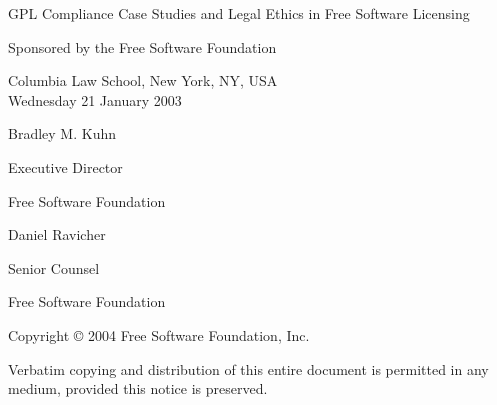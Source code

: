 \documentclass[12pt]{report}
\begin{document}
\begin{titlepage}


\begin{center}

\vspace{.5in}

{\Large {\sc GPL Compliance Case Studies and Legal Ethics in Free Software
    Licensing } \\

\vspace{.7in}

Sponsored by the Free Software Foundation \\


\vspace{.3in}

Columbia Law School, New York, NY, USA \\
\vspace{.1in}
Wednesday 21 January 2003 
}

\vspace{.7in}

{\large
Bradley M. Kuhn

Executive Director

Free Software Foundation
}

\vspace{.3in}


{\large
Daniel Ravicher

Senior Counsel 

Free Software Foundation
}

\end{center}

\vfill

{\parindent 0in
Copyright \copyright{} 2004 \hspace{.2in} Free Software Foundation, Inc.

\vspace{.3in}

Verbatim copying and distribution of this entire document is permitted in
any medium, provided this notice is preserved.
}

\end{titlepage}

\pagestyle{plain}
\end{document}
